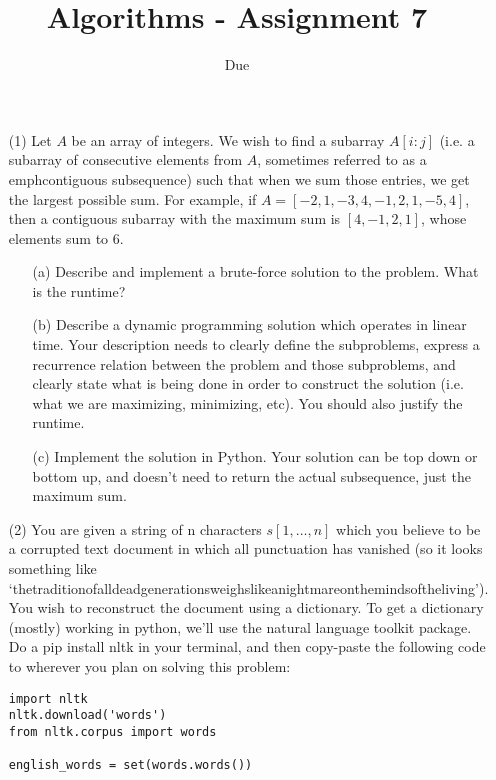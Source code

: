 \documentclass[12pt]{article}
\title{Algorithms - Assignment 7}
\date{Due }
\begin{document}
\maketitle

\begin{enumerate}
    \item[(1)] Let $A$ be an array of integers. We wish to find a subarray $A[i:j]$ (i.e. a subarray of consecutive elements from $A$, sometimes referred to as a 
    emph{contiguous subsequence}) such that when we sum those entries, we get the largest possible sum. For example, if $A=[-2, 1, -3, 4, -1, 2, 1, -5, 4]$, then a contiguous subarray with the maximum sum is $[4,-1,2,1]$, whose elements sum to $6$.
    \begin{itemize}
        \item[(a)] Describe and implement a brute-force solution to the problem. What is the runtime? 
        \item[(b)] Describe a dynamic programming solution which operates in linear time. Your description needs to clearly define the subproblems, express a recurrence relation between the problem and those subproblems, and clearly state what is being done in order to construct the solution (i.e. what we are maximizing, minimizing, etc). You should also justify the runtime. 
        \item[(c)] Implement the solution in Python. Your solution can be top down or bottom up, and doesn't need to return the actual subsequence, just the maximum sum. 
    \end{itemize}
    \item[(2)] You are given a string of n characters $s[1,\ldots,n]$ which you believe to be a corrupted text document in which all punctuation has vanished (so it looks something like `thetraditionofalldeadgenerationsweighslikeanightmareonthemindsoftheliving'). You wish to reconstruct the document using a dictionary. To get a dictionary (mostly) working in python, we'll use the natural language toolkit package. Do a pip install nltk in your terminal, and then copy-paste the following code to wherever you plan on solving this problem: 
    \begin{verbatim}
import nltk
nltk.download('words')
from nltk.corpus import words

english_words = set(words.words())


\end{verbatim}
\end{enumerate}
\end{document}
